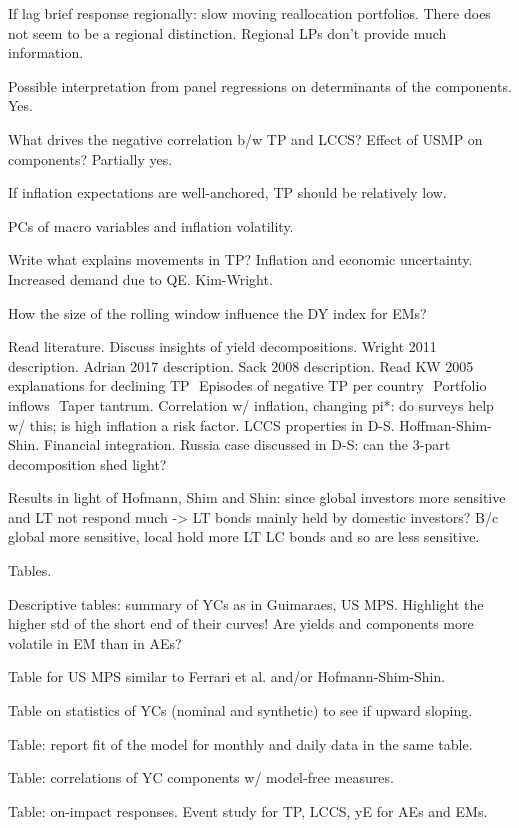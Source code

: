 \documentclass[12pt]{article}
\newcommand{\xmark}{\ding{55}}
\newcommand{\wontdo}{\rlap{$\square$}{\large\hspace{1pt}\xmark}}
\begin{document}
\begin{todolist}
\begin{todolist}
		\item[\wontdo] If lag brief response regionally: slow moving reallocation portfolios. There does not seem to be a regional distinction. Regional LPs don't provide much information.
		\item Possible interpretation from panel regressions on determinants of the components. Yes.
		\item What drives the negative correlation b/w TP and LCCS? Effect of USMP on components? Partially yes.
		\item If inflation expectations are well-anchored, TP should be relatively low.
		\item PCs of macro variables and inflation volatility.
		\item Write what explains movements in TP? Inflation and economic uncertainty. Increased demand due to QE. Kim-Wright.
		\item How the size of the rolling window influence the DY index for EMs?
		\item Read literature. Discuss insights of yield decompositions. Wright 2011 description. Adrian 2017 description. Sack 2008 description. Read KW 2005 explanations for declining TP \(<->\) Episodes of negative TP per country \(<->\) Portfolio inflows \(<->\) Taper tantrum. Correlation w/ inflation, changing pi*: do surveys help w/ this; is high inflation a risk factor. LCCS properties in D-S. Hoffman-Shim-Shin. Financial integration. Russia case discussed in D-S: can the 3-part decomposition shed light?
		\item Results in light of Hofmann, Shim and Shin: since global investors more sensitive and LT not respond much -> LT bonds mainly held by domestic investors? B/c global more sensitive, local hold more LT LC bonds and so are less sensitive.
	\end{todolist}
	
	\item Tables.
	\begin{todolist}
		\item Descriptive tables: summary of YCs as in Guimaraes, US MPS. Highlight the higher std of the short end of their curves! Are yields and components more volatile in EM than in AEs?
		\item Table for US MPS similar to Ferrari et al. and/or Hofmann-Shim-Shin.
		\item Table on statistics of YCs (nominal and synthetic) to see if upward sloping.
		\item Table: report fit of the model for monthly and daily data in the same table.
		\item Table: correlations of YC components w/ model-free measures.
		\item Table: on-impact responses. Event study for TP, LCCS, yE for AEs and EMs.
	\end{todolist}
	

\end{todolist}
\end{document}
